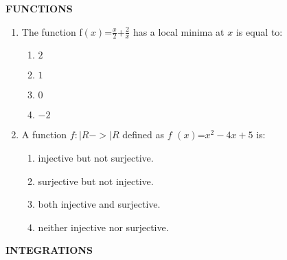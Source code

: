 \documentclass[12pt,-letter paper]{article}
\providecommand{\brak}[1]{\ensuremath{\left(#1\right)}}
\begin{document}
\begin{center}
        \textbf{FUNCTIONS}                                                      \end{center}
      \begin{enumerate}
        \item
   The function f$\brak{x}$=$\frac{x}{2}$+$\frac{2}{x}$ has a local minima at $x$ is equal to:

                \begin{enumerate}[label={$\brak{\Alph*}$}]
                        \item$2$
                        \item$1$
                        \item$0$
                        \item$-2$
                \end{enumerate}
        \item
   A function $f:|R->|R $ defined as $ f $ $\brak{x}$=$x^2-4x+5$ is:
                \begin{enumerate}[label={$\brak{\Alph*}$}]
                        \item injective but not surjective.
                        \item surjective but not injective.
                        \item both injective and surjective.
                        \item neither injective nor surjective.
                                \end{enumerate}                                                          \end{enumerate}
                 \begin{center}                                                          \textbf{INTEGRATIONS} 
		 \end{center}                                         
\end{document}
